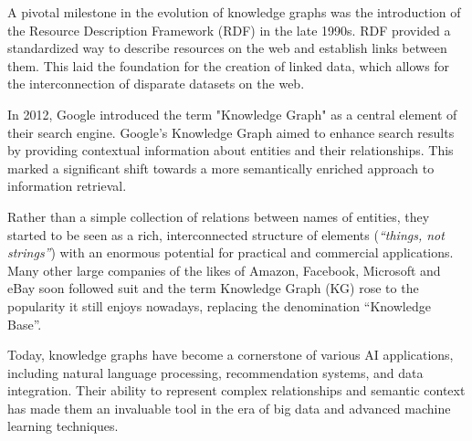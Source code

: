 A pivotal milestone in the evolution of knowledge graphs was the introduction of the Resource Description Framework (RDF) in the late 1990s. RDF provided a standardized way to describe resources on the web and establish links between them. This laid the foundation for the creation of linked data, which allows for the interconnection of disparate datasets on the web.

In 2012, Google introduced the term "Knowledge Graph" as a central element of their search engine. Google's Knowledge Graph aimed to enhance search results by providing contextual information about entities and their relationships. This marked a significant shift towards a more semantically enriched approach to information retrieval.

Rather than a simple collection of relations between names of entities, they started to be seen as a rich, interconnected structure of elements (\textit{``things, not strings''}) with an enormous potential for practical and commercial applications. Many other large companies of the likes of Amazon, Facebook, Microsoft and eBay soon followed suit 
and the term Knowledge Graph (KG) rose to the popularity it still enjoys nowadays, replacing the denomination ``Knowledge Base''.

Today, knowledge graphs have become a cornerstone of various AI applications, including natural language processing, recommendation systems, and data integration. Their ability to represent complex relationships and semantic context has made them an invaluable tool in the era of big data and advanced machine learning techniques.



